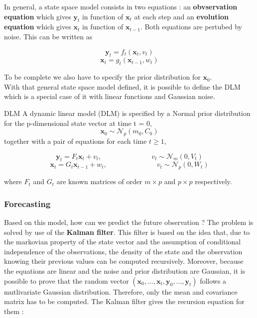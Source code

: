 \documentclass{article}
\begin{document}
In general, a state space model consists in two equations : an \textbf{obvservation equation} which gives $\mathbf{y}_t$ in function of $\mathbf{x}_t$ at each step and an \textbf{evolution equation} which gives $\mathbf{x}_t$ in function of $\mathbf{x}_{t-1}$. Both equations are pertubed by noise. This can be written as

$$\mathbf{y}_t = f_t(\mathbf{x}_t, v_t)$$
$$\mathbf{x}_t = g_t(\mathbf{x}_{t-1}, w_t)$$

To be complete we also have to specify the prior distribution for $\mathbf{x}_0$. \\

With that general state space model defined, it is possible to define the DLM which is a special case of it with linear functions and Gaussian noise. \\

\theoremstyle{definition}
\begin{definition}{DLM}
A dynamic linear model (DLM) is specified by a Normal prior distribution for the p-dimensional state vector at time t = 0,
$$\mathbf{x}_0 \sim \mathcal{N}_p(m_0, C_0)$$
together with a pair of equations for each time $t \ge 1$,

$$\mathbf{y}_t = F_t\mathbf{x}_t + v_t, \hspace{3cm} v_t \sim \mathcal{N}_m(0, V_t)$$
$$\mathbf{x}_t = G_t\mathbf{x}_{t-1} + w_t, \hspace{3cm} v_t \sim \mathcal{N}_p(0, W_t)$$

where $F_t$ and $G_t$ are known matrices of order $m \times p$ and $p \times p$ respectively.
\end{definition}

\subsubsection*{Forecasting}

Based on this model, how can we predict the future observation ? The problem is solved by use of the \textbf{Kalman filter}. This filter is based on the idea that, due to the markovian property of the state vector and the assumption of conditional independence of the observations, the density of the state and the observation knowing their previous values can be computed recursively. Moreover, because the equations are linear and the noise and prior distribution are Gaussian, it is possible to prove that the random vector $(\mathbf{x}_0, ..., \mathbf{x}_t, \mathbf{y}_0, ..., \mathbf{y}_t)$ follows a mutlivariate Gaussian distribution. Therefore, only the mean and covariance matrix has to be computed. The Kalman filter gives the recursion equation for them : \\
\end{document}
